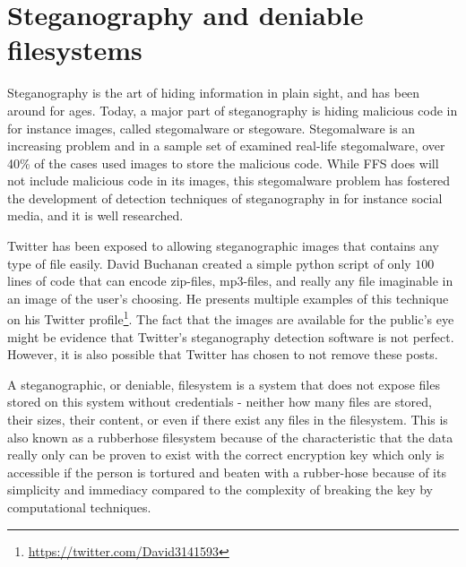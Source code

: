 \section{Steganography and deniable filesystems}
Steganography is the art of hiding information in plain sight, and has been around for ages. Today, a major part of steganography is hiding malicious code in for instance images, called stegomalware or stegoware. Stegomalware is an increasing problem and in a sample set of examined real-life stegomalware, over 40\% of the cases used images to store the malicious code\cite{stichtingcuingfoundationSIMARGLStegwarePrimer2020}. While FFS does will not include malicious code in its images, this stegomalware problem has fostered the development of detection techniques of steganography in for instance social media, and it is well researched. 

Twitter has been exposed to allowing steganographic images that contains any type of file easily\cite{TwitterImagesCan}. David Buchanan created a simple python script of only $100$ lines of code that can encode zip-files, mp3-files, and really any file imaginable in an image of the user's choosing\cite{buchananTweetablepolyglotpng2022}. He presents multiple examples of this technique on his Twitter profile\footnote{\url{https://twitter.com/David3141593}}. The fact that the images are available for the public's eye might be evidence that Twitter's steganography detection software is not perfect. However, it is also possible that Twitter has chosen to not remove these posts.

A steganographic, or deniable, filesystem is a system that does not expose files stored on this system without credentials - neither how many files are stored, their sizes, their content, or even if there exist any files in the filesystem\cite{petersDEFYDeniableFile2014}. This is also known as a rubberhose filesystem because of the characteristic that the data really only can be proven to exist with the correct encryption key which only is accessible if the person is tortured and beaten with a rubber-hose because of its simplicity and immediacy compared to the complexity of breaking the key by computational techniques.


